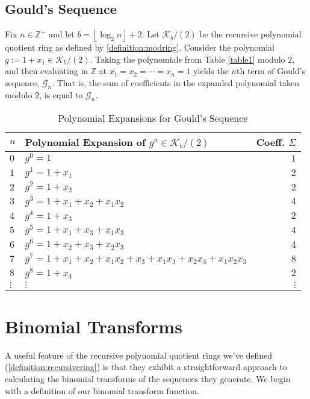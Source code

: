 \documentclass[12pt,reqno]{article}
\theoremstyle{plain}
\newcommand{\floor}[1]{\left\lfloor #1 \right\rfloor}
\newcommand{\Z}{\mathbb{Z}}
\newcommand{\K}{\mathcal{K}}
\newcommand{\Goulds}{\mathcal{G}}
\begin{document}
\subsection{Gould's Sequence} \label{section:demonstrations:goulds}
Fix $n \in \Z^+$ and let $b={\floor{\log_2 n}+2}$. Let $\K_b/(2)$ be the recursive polynomial quotient ring as defined by \cref{definition:modring}. Consider the polynomial $g := 1 + x_1 \in \K_b/(2)$. Taking the polynomials from Table \ref{table1} modulo $2$, and then evaluating in $\Z$ at $x_1=x_2=\cdots=x_n=1$ yields the $n$th term of Gould's sequence, $\Goulds_n$. That is, the sum of coefficients in the expanded polynomial taken modulo $2$, is equal to $\Goulds_n$.
\begin{table}[ht]
\small
\begin{tabularx}{\textwidth}{|l|X|r|}
\hline
$n$ & Polynomial Expansion of $g^n \in \K_b/(2)$ & Coeff. $\Sigma$ \\
\hline
$0$ & $g^0 = 1$ & $1$ \\
$1$ & $g^1 = 1+x_1$ & $2$ \\
$2$ & $g^2 = 1+x_2$ & $2$ \\
$3$ & $g^3 = 1+x_1+x_2+x_1x_2$ & $4$ \\
$4$ & $g^4 = 1+x_3$ & $2$ \\
$5$ & $g^5 = 1+x_1+x_3+x_1x_3$ & $4$ \\
$6$ & $g^6 = 1+x_2+x_3+x_2x_3$ & $4$ \\
$7$ & $g^7 = 1+x_1+x_2+x_1x_2+x_3+x_1x_3+x_2x_3+x_1x_2x_3$ & $8$ \\
$8$ & $g^8 = 1+x_4$ & $2$ \\
$\vdots$ & $\vdots$ & $\vdots$ \\
\hline
\end{tabularx}
\normalsize
\caption{Polynomial Expansions for Gould's Sequence}
\label{table2}
\end{table}
\FloatBarrier

\section{Binomial Transforms}
A useful feature of the recursive polynomial quotient rings we've defined (\cref{definition:recursivering}) is that they exhibit a straightforward approach to calculating the binomial transforms of the sequences they generate. We begin with a definition of our binomial transform function.
\end{document}
